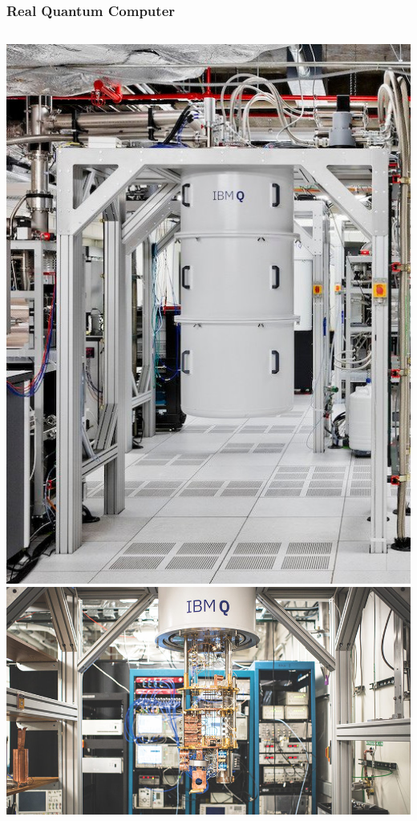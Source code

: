 \documentclass[aspectratio=169,11pt,hyperref={colorlinks=true}]{beamer}
\begin{document}
\begin{frame}
    \frametitle{Real Quantum Computer}
    \begin{columns}[t]
            \centering
            \includegraphics[height=.45\textheight]{outside.jpg}\\
            \includegraphics[height=.45\textheight]{inside-1.jpg}

\end{columns}
\end{frame}
\end{document}
